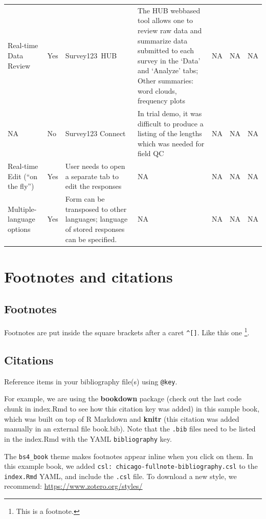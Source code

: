 \documentclass[
]{book}
\theoremstyle{definition}
\theoremstyle{definition}
\theoremstyle{definition}
\theoremstyle{definition}
\theoremstyle{remark}
\begin{document}
\begin{longtable}[t]{lllllrl}
\addlinespace
Real-time Data Review & Yes & Survey123 HUB & The HUB webbased tool allows one to review raw data and summarize data submitted to each survey in the ‘Data’ and ‘Analyze’ tabs; Other summaries: word clouds, frequency plots & NA & NA & NA\\
NA & No & Survey123 Connect & In trial demo, it was difficult to produce a listing of the lengths which was needed for field QC & NA & NA & NA\\
Real-time Edit (“on the fly”) & Yes & User needs to open a separate tab to edit the responses & NA & NA & NA & NA\\
Multiple-language options & Yes & Form can be transposed to other languages; language of stored responses can be specified. & NA & NA & NA & NA\\*
\end{longtable}

\hypertarget{footnotes-and-citations}{%
\chapter{Footnotes and citations}\label{footnotes-and-citations}}

\hypertarget{footnotes}{%
\section{Footnotes}\label{footnotes}}

Footnotes are put inside the square brackets after a caret \texttt{\^{}{[}{]}}. Like this one \footnote{This is a footnote.}.

\hypertarget{citations}{%
\section{Citations}\label{citations}}

Reference items in your bibliography file(s) using \texttt{@key}.

For example, we are using the \textbf{bookdown} package \citep{R-bookdown} (check out the last code chunk in index.Rmd to see how this citation key was added) in this sample book, which was built on top of R Markdown and \textbf{knitr} \citep{xie2015} (this citation was added manually in an external file book.bib).
Note that the \texttt{.bib} files need to be listed in the index.Rmd with the YAML \texttt{bibliography} key.

The \texttt{bs4\_book} theme makes footnotes appear inline when you click on them. In this example book, we added \texttt{csl:\ chicago-fullnote-bibliography.csl} to the \texttt{index.Rmd} YAML, and include the \texttt{.csl} file. To download a new style, we recommend: \url{https://www.zotero.org/styles/}
\end{document}
